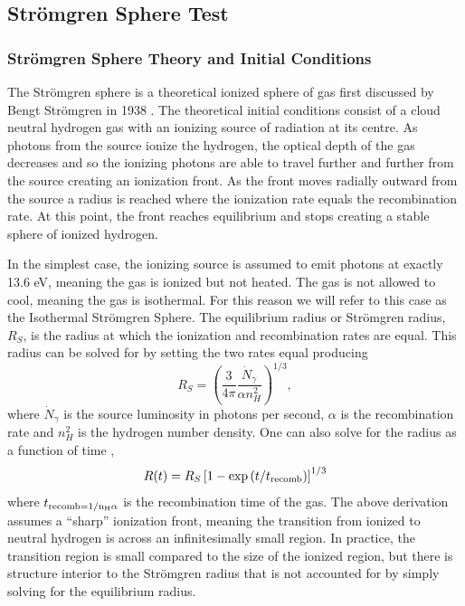 \documentclass[fleq,usenatbib]{mnras}
\newcommand{\strom}{Str\"omgren}
\begin{document}
\subsection{\strom{} Sphere Test}
\subsubsection{\strom{} Sphere Theory and Initial Conditions}
The \strom{} sphere is a theoretical ionized sphere of gas first discussed by 
Bengt \strom{} in 1938 \citep{stromgren39}. The theoretical initial conditions 
consist of a cloud neutral hydrogen gas with an ionizing source of radiation 
at its centre. As photons from the source ionize the hydrogen, the optical 
depth of the gas decreases and so the ionizing photons are able to travel 
further and further from the source creating an ionization front. As the front 
moves radially outward from the source a radius is reached where the 
ionization rate equals the recombination rate. At this point, the front 
reaches equilibrium and stops creating a stable sphere of ionized hydrogen.

In the simplest case, the ionizing source is assumed to emit photons at 
exactly 13.6 eV, meaning the gas is ionized but not heated. The gas is not 
allowed to cool, meaning the gas is isothermal. For this reason we will refer 
to this case as the Isothermal \strom{} Sphere. The equilibrium radius or 
\strom{} radius, $R_S$, is the radius at which the ionization and 
recombination rates are equal. This radius can be solved for by setting the 
two rates equal producing \citep[e.g.][]{tielens05}
\begin{equation}
R_S = \left(\frac{3}{4\pi}\frac{\dot{N}_\gamma}{\alpha n^2_{H}}\right)^{1/3},
\end{equation}
where $\dot{N}_\gamma$ is the source luminosity in photons per second, 
$\alpha$ is the recombination rate and $n^2_H$ is the hydrogen number density. 
One can also solve for the radius as a function of time 
\citep[e.g.][]{spitzer78},
\begin{equation}
R(t) = R_S\left[1-\exp\left(t/t_{\rm recomb}\right)\right]^{1/3}
\end{equation}
where $t_{\rm recomb = 1/{n_H \alpha}}$ is the recombination time of the 
gas. The above derivation assumes a ``sharp'' ionization front, meaning the 
transition from ionized to neutral hydrogen is across an infinitesimally small 
region. In practice, the transition region is small compared to the size of 
the ionized region, but there is structure interior to the \strom{} radius 
that is not accounted for by simply solving for the equilibrium radius. 
\end{document}
